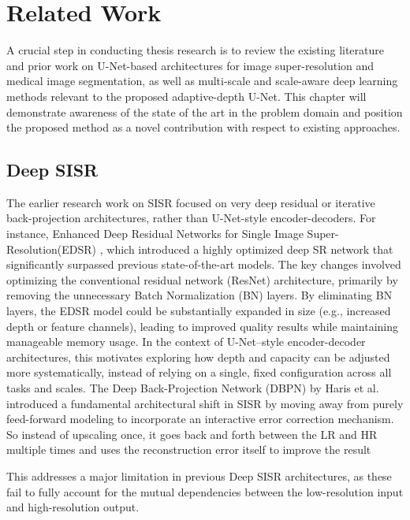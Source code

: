 \chapter{Related Work}
\label{chap:related-work}

A crucial step in conducting thesis research is to review the existing literature and prior work on U-Net-based architectures for image super-resolution and medical image segmentation, as well as multi-scale and scale-aware deep learning methods relevant to the proposed adaptive-depth U-Net. This chapter will demonstrate awareness of the state of the art in the problem domain and position the proposed method as a novel contribution with respect to existing approaches.

\section{Deep SISR}
The earlier research work on SISR focused on very deep residual or iterative back-projection architectures, rather than U-Net-style encoder-decoders. For instance, Enhanced Deep Residual Networks for Single Image Super-Resolution(EDSR) \cite{lim2017edsr}, which introduced a highly optimized deep SR network that significantly surpassed previous state-of-the-art models. The key changes involved optimizing the conventional residual network (ResNet) architecture, primarily by removing the unnecessary Batch Normalization (BN) layers. By eliminating BN layers, the EDSR model could be substantially expanded in size (e.g., increased depth or feature channels), leading to improved quality results while maintaining manageable memory usage.  In the context of U-Net--style encoder-decoder architectures, this motivates exploring how depth and capacity can be adjusted more systematically, instead of relying on a single, fixed configuration across all tasks and scales.
\newline
The Deep Back-Projection Network (DBPN) by Haris et al. \cite{haris2018dbpn} introduced a fundamental architectural shift in SISR by moving away from purely feed-forward modeling to incorporate an interactive error correction mechanism. So instead of upscaling once, it goes back and forth between the LR and HR multiple times and uses the reconstruction error itself to improve the result 

This addresses a major limitation in previous Deep SISR architectures, as these fail to fully account for the mutual dependencies between the low-resolution input and high-resolution output. 

